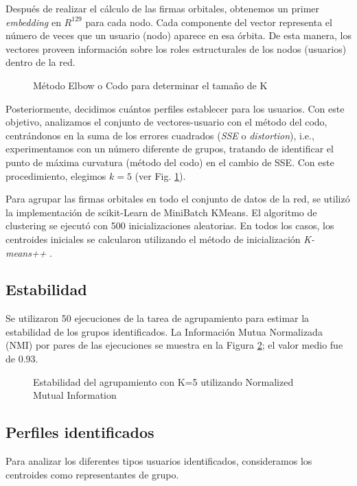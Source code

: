 Después de realizar el cálculo de las firmas orbitales, obtenemos un primer \textit{embedding} en ${R}^{129}$ para cada nodo. Cada componente del vector representa el número de veces que un usuario (nodo) aparece en esa órbita. De esta manera, los vectores proveen información sobre los roles estructurales de los nodos (usuarios) dentro de la red.

 \begin{figure}[htbp]
   \centering
   
    \caption{Método Elbow o Codo para determinar el tamaño de K}
    \label{fig:elbowmethod}
\end{figure}

Posteriormente, decidimos cuántos perfiles establecer para los usuarios. Con este objetivo, analizamos el conjunto de vectores-usuario con el método del codo, centrándonos en la suma de los errores cuadrados (\textit{SSE} o \textit{distortion}), i.e., experimentamos con un número diferente de grupos, tratando de identificar el punto de máxima curvatura (método del codo) en el cambio de SSE. Con este procedimiento, elegimos $k = 5$ (ver Fig. \ref{fig:elbowmethod}).

Para agrupar las firmas orbitales en todo el conjunto de datos de la red, se utilizó la implementación de scikit-Learn de MiniBatch KMeans. El algoritmo de clustering se ejecutó con 500 inicializaciones aleatorias. En todos los casos, los centroides iniciales se calcularon utilizando el método de inicialización \textit{K-means++} \cite{arthur_k-means_nodate}. 

\subsection{Estabilidad}
Se utilizaron 50 ejecuciones de la tarea de agrupamiento para estimar la estabilidad de los grupos identificados. La Información Mutua Normalizada (NMI) por pares de las ejecuciones se muestra en la Figura \ref{fig:estability-NMI}; el valor medio fue de 0.93.

\begin{figure}[htbp]
   \centering
   
    \caption{Estabilidad del agrupamiento con K=5 utilizando Normalized Mutual Information}
    \label{fig:estability-NMI}
\end{figure}

\subsection{Perfiles identificados}
Para analizar los diferentes tipos usuarios identificados, consideramos los centroides como representantes de grupo. 

